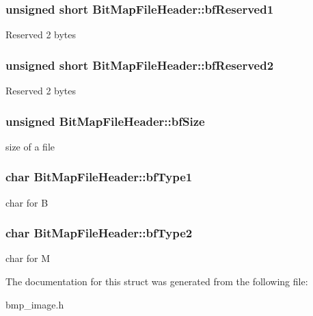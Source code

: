 \subsubsection[{\texorpdfstring{bf\+Reserved1}{bfReserved1}}]{\setlength{\rightskip}{0pt plus 5cm}unsigned short Bit\+Map\+File\+Header\+::bf\+Reserved1}\hypertarget{structBitMapFileHeader_a2c5cfaf1990593f4b9f980bcb528e82f}{}\label{structBitMapFileHeader_a2c5cfaf1990593f4b9f980bcb528e82f}
Reserved 2 bytes 
\subsubsection[{\texorpdfstring{bf\+Reserved2}{bfReserved2}}]{\setlength{\rightskip}{0pt plus 5cm}unsigned short Bit\+Map\+File\+Header\+::bf\+Reserved2}\hypertarget{structBitMapFileHeader_aeaae0d627a62f9ca61be427dc3a99852}{}\label{structBitMapFileHeader_aeaae0d627a62f9ca61be427dc3a99852}
Reserved 2 bytes 
\subsubsection[{\texorpdfstring{bf\+Size}{bfSize}}]{\setlength{\rightskip}{0pt plus 5cm}unsigned Bit\+Map\+File\+Header\+::bf\+Size}\hypertarget{structBitMapFileHeader_a18198264845f2443c8b6d972c4bd404f}{}\label{structBitMapFileHeader_a18198264845f2443c8b6d972c4bd404f}
size of a file 
\subsubsection[{\texorpdfstring{bf\+Type1}{bfType1}}]{\setlength{\rightskip}{0pt plus 5cm}char Bit\+Map\+File\+Header\+::bf\+Type1}\hypertarget{structBitMapFileHeader_a9fec7cc3a304b3f557a6ab13f58b35ca}{}\label{structBitMapFileHeader_a9fec7cc3a304b3f557a6ab13f58b35ca}
char for \textquotesingle{}B\textquotesingle{} 
\subsubsection[{\texorpdfstring{bf\+Type2}{bfType2}}]{\setlength{\rightskip}{0pt plus 5cm}char Bit\+Map\+File\+Header\+::bf\+Type2}\hypertarget{structBitMapFileHeader_a561a5c86bbc4f06973f803ee0b7b2f60}{}\label{structBitMapFileHeader_a561a5c86bbc4f06973f803ee0b7b2f60}
char for \textquotesingle{}M\textquotesingle{} 

The documentation for this struct was generated from the following file\+:\begin{DoxyCompactItemize}
\item 
bmp\+\_\+image.\+h\end{DoxyCompactItemize}
